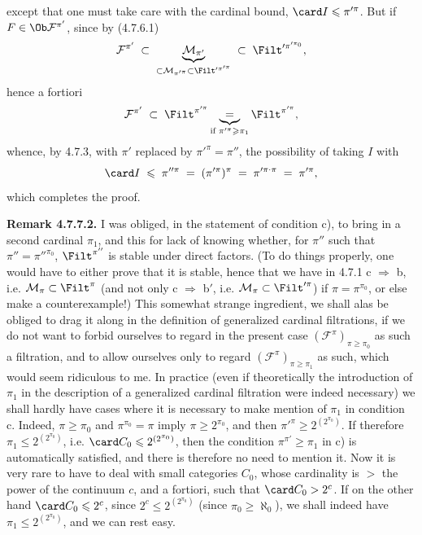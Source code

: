 \noindent{}
except that one must take care with the cardinal bound, $\card I \leqslant \pi'^{\pi}$. But if $F \in \Ob\mathcal{F}^{\pi'}$, since by (4.7.6.1)
\[
\mathcal{F}^{\pi'} \;\subset\; \underbrace{\mathcal{M}_{\pi'}}_{\subset\mathcal{M}_{\pi'^{\pi}}\subset\Filt'^{\pi'^{\pi}}} \;\subset\; \Filt'^{\pi'^{\pi_0}} ,
\]
hence a fortiori
\[
\mathcal{F}^{\pi'} \;\subset\; \Filt^{\pi'^{\pi}} \underbrace{\;=\;}_{\text{if } \pi'^{\pi}\geqslant\pi_1} \Filt^{\pi'^{\pi}} , %
\]
whence, by 4.7.3, with $\pi'$ replaced by $\pi'^{\pi}=\pi''$, the possibility of taking $I$ with
\[
\card I \;\leqslant\; \pi''^{\pi} \;=\; (\pi'^{\pi})^{\pi} \;=\; \pi'^{\pi\cdot\pi} \;=\; \pi'^{\pi} ,
\]
which completes the proof.

\noindent{}\textbf{Remark 4.7.7.2.} I was obliged, in the statement of condition c), to bring in a second cardinal $\pi_1$, and this for lack of knowing whether, for $\pi''$ such that $\pi''=\pi''^{\pi_0}$, $\Filt^{\pi''}$ is stable under direct factors. (To do things properly, one would have to either prove that it is stable, hence that we have in 4.7.1 c $\Longrightarrow$ b, i.e. $\mathcal{M}_\pi\subset\Filt^{\pi}$ (and not only c $\Longrightarrow$ b$'$, i.e. $\mathcal{M}_\pi\subset\Filt'^{\pi}$) if $\pi=\pi^{\pi_0}$, or else make a counterexample!) This somewhat strange ingredient, we shall alas be obliged to drag it along in the definition of generalized cardinal filtrations, if we do not want to forbid ourselves to regard in the present case $(\mathcal{F}^{\pi})_{\pi\geqslant\pi_0}$ as such a filtration, and to allow ourselves only to regard $(\mathcal{F}^{\pi})_{\pi\geqslant\pi_1}$ as such, which would seem ridiculous to me. In practice (even if theoretically the introduction of $\pi_1$ in the description of a generalized cardinal filtration were indeed necessary) we shall hardly have cases where it is necessary to make mention of $\pi_1$ in condition c. Indeed, $\pi\geqslant\pi_0$ and $\pi^{\pi_0}=\pi$ imply $\pi\geqslant 2^{\pi_0}$, and then $\pi'^{\pi}\geqslant 2^{(2^{\pi_0})}$. If therefore $\pi_1\leqslant 2^{(2^{\pi_0})}$, i.e. $\card C_0\leqslant 2^{(2^{\pi_0})}$, then the condition $\pi^{\pi'}\geqslant\pi_1$ in c) is automatically satisfied, and there is therefore no need to mention it. Now it is very rare to have to deal with small categories $C_0$, whose cardinality is $>$ the power %
of the continuum $c$, and a fortiori, such that $\card C_0 > 2^{c}$. If on the other hand $\card C_0\leqslant 2^{c}$, since $2^{c}\leqslant 2^{(2^{\pi_0})}$ (since $\pi_0\geqslant\aleph_0$), we shall indeed have $\pi_1\leqslant 2^{(2^{\pi_0})}$, and we can rest easy.

